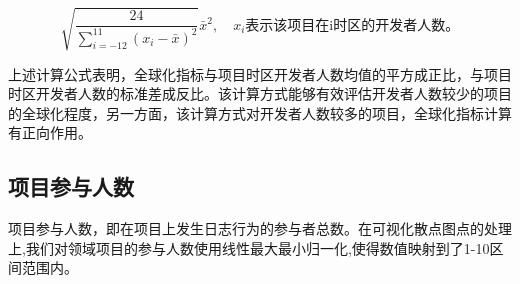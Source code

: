 $$ \sqrt{\frac{24}{\sum_{i=-12}^{11}{(x_i-\bar{x})^2}}}\bar{x}^2, \quad x_i\text{表示该项目在i时区的开发者人数。} $$

\par 上述计算公式表明，全球化指标与项目时区开发者人数均值的平方成正比，与项目时区开发者人数的标准差成反比。该计算方式能够有效评估开发者人数较少的项目的全球化程度，另一方面，该计算方式对开发者人数较多的项目，全球化指标计算有正向作用。

\subsection{项目参与人数}
\par 项目参与人数，即在项目上发生日志行为的参与者总数。在可视化散点图点的处理上,我们对领域项目的参与人数使用线性最大最小归一化,使得数值映射到了1-10区间范围内\cite{mcdonald2013performance}。






